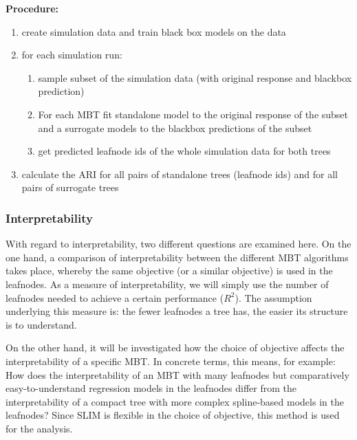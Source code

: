\vspace{0.5 cm}

\textbf{Procedure:} 
\begin{enumerate}
    \item create simulation data and train black box models on the data 
    \item for each simulation run:
    \begin{enumerate}
        \item sample subset of the simulation data (with original response and blackbox prediction)
        \item For each MBT fit standalone model to the original response of the subset and a surrogate models to the  blackbox predictions of the subset
        \item get predicted leafnode ids of the whole simulation data for both trees
    \end{enumerate}
    \item calculate the ARI for all pairs of standalone trees (leafnode ids) and for all pairs of surrogate trees
\end{enumerate}






\subsubsection{Interpretability}


With regard to interpretability, two different questions are examined here. On the one hand, a comparison of interpretability between the different MBT algorithms takes place, whereby the same objective (or a similar objective) is used in the leafnodes. As a measure of interpretability, we will simply use the number of leafnodes needed to achieve a certain performance ($R^2$).  The assumption underlying this measure is: the fewer leafnodes a tree has, the easier its structure is to understand.

\vspace{0.5cm}

On the other hand, it will be investigated how the choice of objective affects the interpretability of a specific MBT. In concrete terms, this means, for example: How does the interpretability of an MBT with many leafnodes but comparatively easy-to-understand regression models in the leafnodes differ from the interpretability of a compact tree with more complex spline-based models in the leafnodes?  Since SLIM is  flexible in the choice of objective, this method is used for the analysis.


